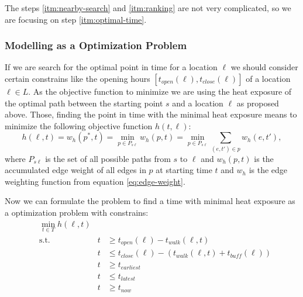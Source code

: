 The steps \ref{itm:nearby-search} and \ref{itm:ranking} are not very complicated, so we are focusing on step \ref{itm:optimal-time}. 

\subsubsection{Modelling as a Optimization Problem} 

If we are search for the optimal point in time for a location $\ell$ we should consider certain constrains like the opening hours $[t_{open}(\ell),t_{close}(\ell)]$ of a location $\ell \in L$. As the objective function to minimize we are using the heat exposure of the optimal path between the starting point $s$ and a location $\ell$ as proposed above. Those, finding the point in time with the minimal heat exposure means to minimize the following objective function $h(t, \ell)$:
	\begin{equation}\label{eq:objective-funtion}
		h(\ell, t) = w_h(p^*, t) = \min_{p\in P_{s\ell}} w_h(p, t) = \min_{p\in P_{s\ell}} \sum_{(e, t') \in p} w_h(e, t'),
	\end{equation}
where $P_{s\ell}$ is the set of all possible paths from $s$ to $\ell$ and $w_h(p, t)$ is the accumulated edge weight of all edges in $p$ at starting time $t$ and $w_h$ is the edge weighting function from equation \eqref{eq:edge-weight}. 

Now we can formulate the problem to find a time with minimal heat exposure as a optimization problem with constrains:
\begin{subequations}
	\label{eq:optimal-time}
	\begin{alignat}{2}
	&\min_{t \in T} h(\ell, t) && \label{eq:optimal-time:of} \\
	&\text{s.t.} & t & \geq t_{open}(\ell)-t_{walk}(\ell, t) \label{eq:optimal-time:twm}\\
	&	& t & \leq   t_{close}(\ell)-(t_{walk}(\ell, t)+t_{buff}(\ell))	\label{eq:optimal-time:twe}\\
	&	&  t & \geq t_{earliest} \label{eq:optimal-time:te} \\
	&	&  t & \leq t_{latest} \label{eq:optimal-time:tl} \\
	&  & t  & \geq t_{now} \label{eq:optimal-time:tn} 
	\end{alignat}
\end{subequations}

